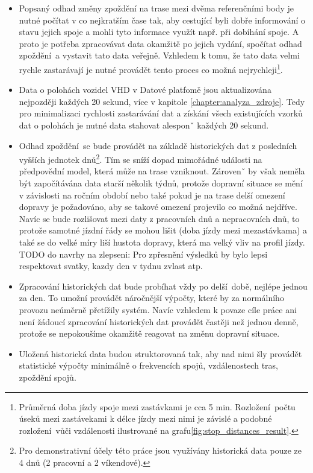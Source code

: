 \begin{itemize}
	\item
Popsaný odhad změny zpoždění na trase mezi dvěma referenčními body je nutné počítat v co nejkratším čase tak, aby cestující byli dobře informování o stavu jejich spoje a mohli tyto informace využít např. při dobíhání spoje. A proto je potřeba zpracovávat data okamžitě po jejich vydání, spočítat odhad zpoždění a vystavit tato data veřejně. Vzhledem k tomu, že tato data velmi rychle zastarávají je nutné provádět tento proces co možná nejrychleji\footnote{Průměrná doba jízdy spoje mezi zastávkami je cca 5 min. Rozložení počtu úseků mezi zastávekami k délce jízdy mezi nimi je závislé a podobné rozložení vůči vzdálenosti ilustrované na grafu\ref{fig:stop_distances_result}.}.

\item

Data o polohách vozidel VHD v Datové platfomě jsou aktualizována nejpozději každých 20 sekund, více v kapitole \ref{chapter:analyza_zdroje}. Tedy pro minimalizaci rychlosti zastarávání dat a získání všech existujících vzorků dat o polohách je nutné data stahovat alesponˇ každých 20 sekund.

\item

Odhad zpoždění se bude provádět na základě historických dat z posledních vyšších jednotek dnů\footnote{Pro demonstrativní účely této práce jsou využívány historická data pouze ze 4 dnů (2 pracovní a 2 víkendové).}. Tím se sníží dopad mimořádné události na předpovědní model, která může na trase vzniknout. Zárovenˇ by však neměla být započítávána data starší několik týdnů, protože dopravní situace se mění v závislosti na ročním období nebo také pokud je na trase delší omezení dopravy je požadováno, aby se takové omezení projevilo co možná nejdříve. Navíc se bude rozlišovat mezi daty z pracovních dnů a nepracovních dnů, to protože samotné jízdní řády se mohou lišit (doba jízdy mezi mezastávkama) a také se do velké míry liší hustota dopravy, která ma velký vliv na profil jízdy. TODO do navrhy na zlepseni: Pro zpřesnění výsledků by bylo lepsi respektovat svatky, kazdy den v tydnu zvlast atp.

\item

Zpracování historických dat bude probíhat vždy po delší době, nejlépe jednou za den. To umožní provádět náročnější výpočty, které by za normálního provozu neúměrně přetížily systém. Navíc vzhledem k povaze cíle práce ani není žádoucí zpracování historických dat provádět častěji než jednou denně, protože se nepokoušíme okamžitě reagovat na změnu dopravní situace.

\item

Uložená historická data budou struktorovaná tak, aby nad nimi šly provádět statistické výpočty minimálně o frekvencích spojů, vzdálenostech tras, zpoždění spojů.
\end{itemize}


